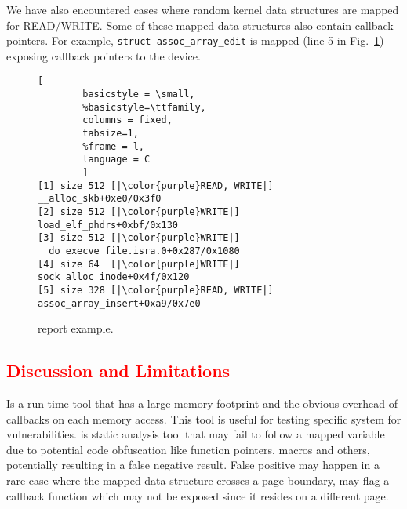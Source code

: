 We have also encountered cases where random kernel data structures are mapped for READ/WRITE. Some of these mapped data structures also contain callback pointers. For example, \texttt{struct assoc\_array\_edit} is mapped (line 5 in Fig.~\ref{fig:dkasan-report}) exposing callback pointers to the device. 
%
\begin{figure}[t]
\begin{adjustbox}{width=0.9\linewidth}
        \begin{lstlisting}[
        basicstyle = \small,
        %basicstyle=\ttfamily,
        columns = fixed,
        tabsize=1,
        %frame = l,
        language = C
        ]
[1] size 512 [|\color{purple}READ, WRITE|] __alloc_skb+0xe0/0x3f0
[2] size 512 [|\color{purple}WRITE|] load_elf_phdrs+0xbf/0x130
[3] size 512 [|\color{purple}WRITE|] __do_execve_file.isra.0+0x287/0x1080
[4] size 64  [|\color{purple}WRITE|] sock_alloc_inode+0x4f/0x120
[5] size 328 [|\color{purple}READ, WRITE|] assoc_array_insert+0xa9/0x7e0
        \end{lstlisting}
\end{adjustbox}
        \caption{\dkasan report example.}
        \label{fig:dkasan-report}
\end{figure}

\subsection{\textcolor{red}{Discussion and Limitations}}
\dkasan Is a run-time tool that has a large memory footprint and the obvious overhead of callbacks on each memory access. This tool is useful for testing specific system for vulnerabilities.
\tool is static analysis tool that may fail to follow a mapped variable due to potential code obfuscation like function pointers, macros and others, potentially resulting in a false negative result. False positive may happen in a rare case where the mapped  data  structure  crosses  a  page  boundary,  \tool may flag a callback function which may not be exposed since it resides on a different page.